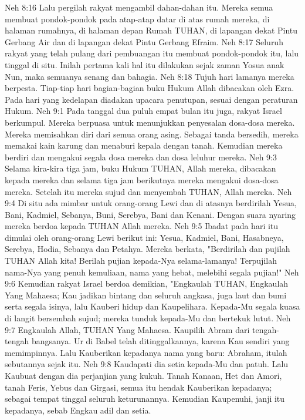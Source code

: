 Neh 8:16  Lalu pergilah rakyat mengambil dahan-dahan itu. Mereka semua membuat pondok-pondok pada atap-atap datar di atas rumah mereka, di halaman rumahnya, di halaman depan Rumah TUHAN, di lapangan dekat Pintu Gerbang Air dan di lapangan dekat Pintu Gerbang Efraim.
Neh 8:17  Seluruh rakyat yang telah pulang dari pembuangan itu membuat pondok-pondok itu, lalu tinggal di situ. Inilah pertama kali hal itu dilakukan sejak zaman Yosua anak Nun, maka semuanya senang dan bahagia.
Neh 8:18  Tujuh hari lamanya mereka berpesta. Tiap-tiap hari bagian-bagian buku Hukum Allah dibacakan oleh Ezra. Pada hari yang kedelapan diadakan upacara penutupan, sesuai dengan peraturan Hukum.
Neh 9:1  Pada tanggal dua puluh empat bulan itu juga, rakyat Israel berkumpul. Mereka berpuasa untuk menunjukkan penyesalan dosa-dosa mereka. Mereka memisahkan diri dari semua orang asing. Sebagai tanda bersedih, mereka memakai kain karung dan menaburi kepala dengan tanah. Kemudian mereka berdiri dan mengakui segala dosa mereka dan dosa leluhur mereka.
Neh 9:3  Selama kira-kira tiga jam, buku Hukum TUHAN, Allah mereka, dibacakan kepada mereka dan selama tiga jam berikutnya mereka mengakui dosa-dosa mereka. Setelah itu mereka sujud dan menyembah TUHAN, Allah mereka.
Neh 9:4  Di situ ada mimbar untuk orang-orang Lewi dan di atasnya berdirilah Yesua, Bani, Kadmiel, Sebanya, Buni, Serebya, Bani dan Kenani. Dengan suara nyaring mereka berdoa kepada TUHAN Allah mereka.
Neh 9:5  Ibadat pada hari itu dimulai oleh orang-orang Lewi berikut ini: Yesua, Kadmiel, Bani, Hasabneya, Serebya, Hodia, Sebanya dan Petahya. Mereka berkata, "Berdirilah dan pujilah TUHAN Allah kita! Berilah pujian kepada-Nya selama-lamanya! Terpujilah nama-Nya yang penuh kemuliaan, nama yang hebat, melebihi segala pujian!"
Neh 9:6  Kemudian rakyat Israel berdoa demikian, "Engkaulah TUHAN, Engkaulah Yang Mahaesa; Kau jadikan bintang dan seluruh angkasa, juga laut dan bumi serta segala isinya, lalu Kauberi hidup dan Kaupelihara. Kepada-Mu segala kuasa di langit bersembah sujud; mereka tunduk kepada-Mu dan bertekuk lutut.
Neh 9:7  Engkaulah Allah, TUHAN Yang Mahaesa. Kaupilih Abram dari tengah-tengah bangsanya. Ur di Babel telah ditinggalkannya, karena Kau sendiri yang memimpinnya. Lalu Kauberikan kepadanya nama yang baru: Abraham, itulah sebutannya sejak itu.
Neh 9:8  Kaudapati dia setia kepada-Mu dan patuh. Lalu Kaubuat dengan dia perjanjian yang kukuh. Tanah Kanaan, Het dan Amori, tanah Feris, Yebus dan Girgasi, semua itu hendak Kauberikan kepadanya; sebagai tempat tinggal seluruh keturunannya. Kemudian Kaupenuhi, janji itu kepadanya, sebab Engkau adil dan setia.
